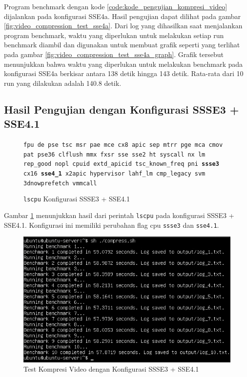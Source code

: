 Program benchmark dengan kode \ref{code:kode_pengujian_kompresi_video} dijalankan pada konfigurasi SSE4a. Hasil pengujian dapat dilihat pada gambar \ref{fig:video_compression_test_sse4a}. Dari log yang dihasilkan saat menjalankan program benchmark, waktu yang diperlukan untuk melakukan setiap run benchmark diambil dan digunakan untuk membuat grafik seperti yang terlihat pada gambar \ref{fig:video_compression_test_sse4a_graph}. Grafik tersebut menunjukkan bahwa waktu yang diperlukan untuk melakukan benchmark pada konfigurasi SSE4a berkisar antara 138 detik hingga 143 detik. Rata-rata dari 10 run yang dilakukan adalah 140.8 detik.
\subsection{Hasil Pengujian dengan Konfigurasi SSSE3 + SSE4.1}
\begin{figure}
    \texttt{fpu de pse tsc msr pae mce cx8 apic sep mtrr pge mca cmov pat pse36 clflush mmx fxsr sse sse2 ht syscall nx lm rep\_good nopl cpuid extd\_apicid tsc\_known\_freq pni \textbf{ssse3} cx16 \textbf{sse4\_1} x2apic hypervisor lahf\_lm cmp\_legacy svm 3dnowprefetch vmmcall}
    \caption{\texttt{lscpu} Konfigurasi SSSE3 + SSE4.1}
    \label{fig:lscpu_video_compression_test_ssse3,sse4.1}
\end{figure}

Gambar \ref{fig:lscpu_video_compression_test_ssse3,sse4.1} menunjukkan hasil dari perintah \texttt{lscpu} pada konfigurasi SSSE3 + SSE4.1. Konfigurasi ini memiliki perubahan flag cpu \texttt{ssse3} dan \texttt{sse4.1}.

\begin{figure}
    \centering
    \includegraphics[width=1\textwidth]
    {assets/pics/video-compression-test/ssse3,sse4.1.jpeg}
    \caption{Test Kompresi Video dengan Konfigurasi SSSE3 + SSE4.1}
    \label{fig:video_compression_test_ssse3,sse4.1}
\end{figure}

